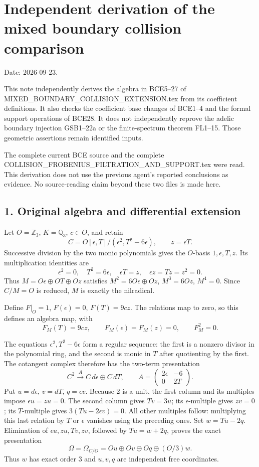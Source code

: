 \documentclass[
  10pt,
]{article}
\author{}
\date{}
\begin{document}
\section{Independent derivation of the mixed boundary collision
comparison}\label{independent-derivation-of-the-mixed-boundary-collision-comparison}

Date: 2026-09-23.

This note independently derives the algebra in BCE5--27 of
MIXED\_BOUNDARY\_COLLISION\_EXTENSION.tex from its coefficient
definitions. It also checks the coefficient base changes of BCE1--4 and
the formal support operations of BCE28. It does not independently
reprove the adelic boundary injection GSB1--22a or the finite-spectrum
theorem FL1--15. Those geometric assertions remain identified inputs.

The complete current BCE source and the complete
COLLISION\_FROBENIUS\_FILTRATION\_AND\_SUPPORT.tex were read. This
derivation does not use the previous agent's reported conclusions as
evidence. No source-reading claim beyond these two files is made here.

\subsection{1. Original algebra and differential
extension}\label{original-algebra-and-differential-extension}

Let \(O=\mathbb Z_3\), \(K=\mathbb Q_3\), \(c\in O\), and retain \[
C=O[\epsilon,T]/(\epsilon^2,T^2-6\epsilon),\qquad z=\epsilon T.
\] Successive division by the two monic polynomials gives the
\(O\)-basis \(1,\epsilon,T,z\). Its multiplication identities are \[
\epsilon^2=0,\quad T^2=6\epsilon,\quad \epsilon T=z,\quad
\epsilon z=Tz=z^2=0.
\] Thus \(M=O\epsilon\oplus OT\oplus Oz\) satisfies
\(M^2=6O\epsilon\oplus Oz\), \(M^3=6Oz\), \(M^4=0\). Since \(C/M=O\) is
reduced, \(M\) is exactly the nilradical.

Define \(F|_O=1\), \(F(\epsilon)=0\), \(F(T)=9cz\). The relations map to
zero, so this defines an algebra map, with \[
F_M(T)=9cz,\qquad F_M(\epsilon)=F_M(z)=0,\qquad F_M^2=0.
\]

The equations \(\epsilon^2,T^2-6\epsilon\) form a regular sequence: the
first is a nonzero divisor in the polynomial ring, and the second is
monic in \(T\) after quotienting by the first. The cotangent complex
therefore has the two-term presentation \[
C^2\xrightarrow{A}C\,d\epsilon\oplus C\,dT,\qquad
A=\begin{pmatrix}2\epsilon&-6\\0&2T\end{pmatrix}.
\] Put \(u=d\epsilon\), \(v=dT\), \(q=\epsilon v\). Because 2 is a unit,
the first column and its multiples impose \(\epsilon u=zu=0\). The
second column gives \(Tv=3u\); its \(\epsilon\)-multiple gives \(zv=0\);
its \(T\)-multiple gives \(3(Tu-2\epsilon v)=0\). All other multiples
follow: multiplying this last relation by \(T\) or \(\epsilon\) vanishes
using the preceding ones. Set \(w=Tu-2q\). Elimination of
\(\epsilon u,zu,Tv,zv\), followed by \(Tu=w+2q\), proves the exact
presentation \[
\Omega=\Omega_{C/O}=Ou\oplus Ov\oplus Oq\oplus(O/3)w.
\] Thus \(w\) has exact order 3 and \(u,v,q\) are independent free
coordinates.
\end{document}
